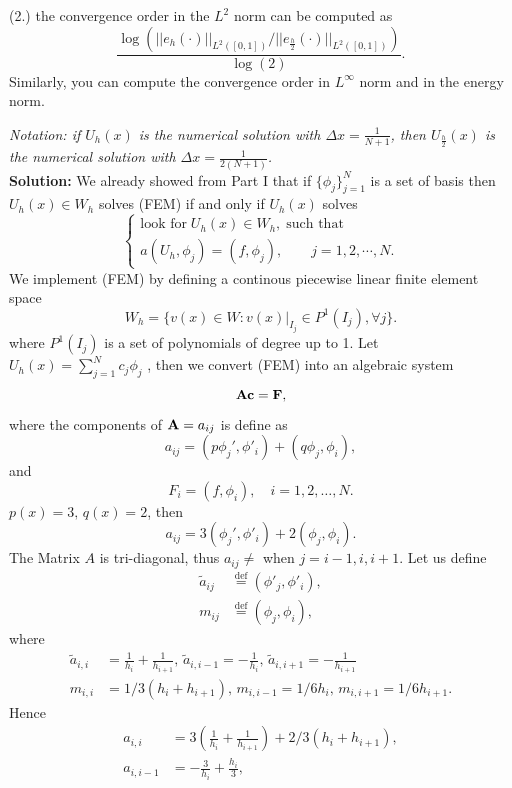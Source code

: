 \documentclass[11pt]{article}      %
\begin{document}
\begin{enumerate}
\begin{itemize}
(2.) the convergence order in the $L^2$ norm can be computed as
$$\frac{\log\left(||e_{h}(\cdot)||_{L^2([0,1])}/||e_{\frac{h}{2}}(\cdot)||_{L^2([0,1])}\right)}{\log (2)}.$$
Similarly, you can compute the convergence order in $L^\infty$ norm and in the energy norm.

\smallskip
{\em Notation: if $U_h(x)$ is the numerical solution with $\Delta x=\frac{1}{N+1}$, then $U_{\frac{h}{2}}(x)$ is the numerical solution with $\Delta x=\frac{1}{2(N+1)}$.}\\
{\bf Solution:} We already showed from Part I that if $\{\phi_j\}_{j=1}^N$ is a set of basis then $U_h(x) \in W_h$ solves (FEM) if and only if $U_h(x)$ solves 
\begin{displaymath}
	\left\{
	\begin{array}{l}
		\mbox{look for} \; U_h(x)\in W_h, \; \mbox{such that}\\
		a(U_h, \phi_j)=(f, \phi_j),\qquad j=1, 2, \cdots, N.
	\end{array}
	\right.
\end{displaymath}
We implement (FEM) by defining a continous piecewise linear finite element space 
$$
W_h=\{v(x)\in W: v(x)|_{I_j}\in P^1(I_j), \forall j\}.
$$
where $P^1(I_j)$ is a set of polynomials of degree up to 1.
Let $U_h(x) = \sum_{j=1}^{N}c_j\phi_j$ , then we convert (FEM) into an algebraic system 
$${\bf Ac} = {\bf F},$$ where the components of ${\bf A} = a_{ij}$ is define as  
$$a_{ij} = (p\phi_j',\phi'_i) + (q\phi_j,\phi_i),$$
and $$F_i = (f,\phi_i), \quad i = 1,2,\ldots,N.$$
$p(x) = 3, \, q(x) = 2$, then 
$$a_{ij} = 3(\phi_j',\phi'_i) + 2(\phi_j,\phi_i).$$ The Matrix $A$ is tri-diagonal, thus $a_{ij} \neq$ when $j = i-1,i,i+1$. Let us define 
\begin{align*}
	\tilde{a}_{ij} &\overset{\text{def}}{=}(\phi'_j,\phi'_i),\\
	m_{ij} &\overset{\text{def}}{=}(\phi_j,\phi_i),
\end{align*}
where
\begin{align*}
	\tilde{a}_{i,i}  &= \frac{1}{h_i} + \frac{1}{h_{i+1}},\,\tilde{a}_{i,i-1} = -\frac{1}{h_i},\,\tilde{a}_{i,i+1} = -\frac{1}{h_{i+1}} \\ 
	m_{i,i}  &= 1/3(h_i + h_{i+1}),\,m_{i,i-1} = 1/6h_i ,\,m_{i,i+1} =1/6 h_{i+1} . 
\end{align*}
Hence 
\begin{align*}
	a_{i,i} &= 3(\frac{1}{h_i} + \frac{1}{h_{i+1}}) + 2/3(h_i + h_{i+1}),\\
	a_{i,i-1} &= -\frac{3}{h_i} +\frac{ h_i}{3},\\

\end{align*}
\end{itemize}
\end{enumerate}
\end{document}
